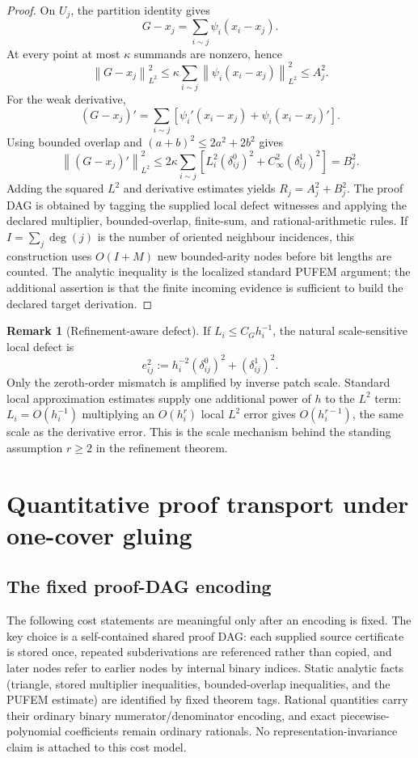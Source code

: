 \documentclass[11pt]{article}
\theoremstyle{definition}
\newtheorem{remark}[theorem]{Remark}
\newcommand{\norm}[1]{\left\lVert #1 \right\rVert}
\begin{document}
\begin{proof}
On $U_j$, the partition identity gives
\[
 G-x_j=\sum_{i\sim j}\psi_i(x_i-x_j).
\]
At every point at most $\kappa$ summands are nonzero, hence
\[
 \norm{G-x_j}_{L^2}^2
 \le\kappa\sum_{i\sim j}
       \norm{\psi_i(x_i-x_j)}_{L^2}^2
 \le A_j^2.
\]
For the weak derivative,
\[
 (G-x_j)'=\sum_{i\sim j}
 \left[\psi_i'(x_i-x_j)+\psi_i(x_i-x_j)'\right].
\]
Using bounded overlap and $(a+b)^2\le2a^2+2b^2$ gives
\[
 \norm{(G-x_j)'}_{L^2}^2
 \le2\kappa\sum_{i\sim j}
 \left[L_i^2(\delta^0_{ij})^2
 +C_\infty^2(\delta^1_{ij})^2\right]=B_j^2.
\]
Adding the squared $L^2$ and derivative estimates yields $R_j=A_j^2+B_j^2$.
The proof DAG is obtained by tagging the supplied local defect witnesses and applying the
declared multiplier, bounded-overlap, finite-sum, and rational-arithmetic rules.  If
$I=\sum_j\deg(j)$ is the number of oriented neighbour incidences, this construction uses
$O(I+M)$ new bounded-arity nodes before bit lengths are counted.  The
analytic inequality is the localized standard PUFEM argument; the additional assertion is
that the finite incoming evidence is sufficient to build the declared target derivation.
\end{proof}

\begin{remark}[Refinement-aware defect]
If $L_i\le C_Gh_i^{-1}$, the natural scale-sensitive local defect is
\[
 e_{ij}^2:=h_i^{-2}(\delta^0_{ij})^2+(\delta^1_{ij})^2.
\]
Only the zeroth-order mismatch is amplified by inverse patch scale.  Standard local approximation estimates supply one additional power of $h$ to the $L^2$ term:
$L_i=O(h_i^{-1})$ multiplying an $O(h_i^r)$ local $L^2$ error gives
$O(h_i^{r-1})$, the same scale as the derivative error.  This is the scale mechanism behind
the standing assumption $r\ge2$ in the refinement theorem.
\end{remark}

\section{Quantitative proof transport under one-cover gluing}\label{sec:onecover}

\subsection{The fixed proof-DAG encoding}

The following cost statements are meaningful only after an encoding is fixed.  The key
choice is a self-contained shared proof DAG: each supplied source certificate is stored once,
repeated subderivations are referenced rather than copied, and later nodes refer to earlier
nodes by internal binary indices.  Static analytic facts (triangle,
stored multiplier inequalities, bounded-overlap inequalities, and the PUFEM estimate)
are identified by fixed theorem tags.  Rational quantities carry their ordinary binary
numerator/denominator encoding, and exact piecewise-polynomial coefficients remain
ordinary rationals.  No representation-invariance claim is attached to this cost model.
\end{document}
